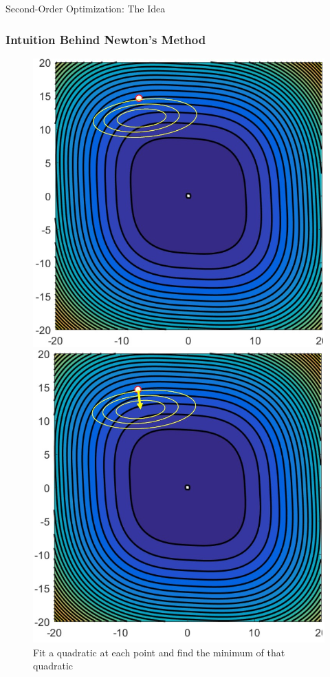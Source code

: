 \begin{frame}{Second-Order Optimization: The Idea}
    \frametitle{Intuition Behind Newton's Method}
    \begin{figure}
        \centering
        \begin{minipage}{.5\textwidth}
            \centering
            \includegraphics[width=\textwidth]{images/intuition_newton1.jpeg}
        \end{minipage}%
            \begin{minipage}{.5\textwidth}
            \centering
            \includegraphics[width=\textwidth]{images/intuition_newton2.jpeg}
        \end{minipage}
    \caption{Fit a quadratic at each point and find the minimum of that quadratic}
    \end{figure}
\end{frame}


